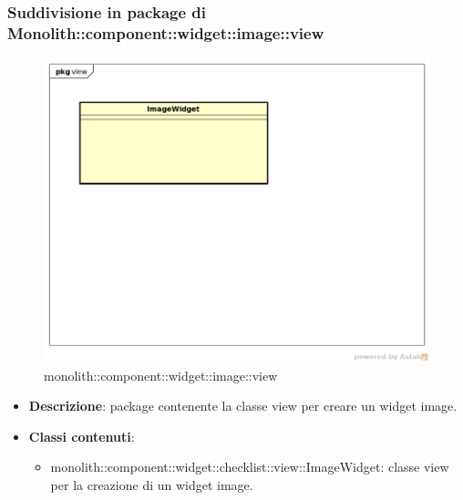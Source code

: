\subsubsection{Suddivisione in package  di Monolith::component::widget::image::view}
\label{monolith::component::widget::image::view}
\begin{figure}[H]
	\centering
	\includegraphics[scale=0.5]{Sezioni/imgPackage/component_widget_image_view.png}
	\caption{monolith::component::widget::image::view}
\end{figure}
\begin{itemize}
	\item{\textbf{Descrizione}}: package contenente la classe view per creare un widget image.
	\item{\textbf{Classi contenuti}}:
	\begin{itemize}
	\item{monolith::component::widget::checklist::view::ImageWidget}: classe view per la creazione di un widget image.
	\end{itemize}
\end{itemize}


